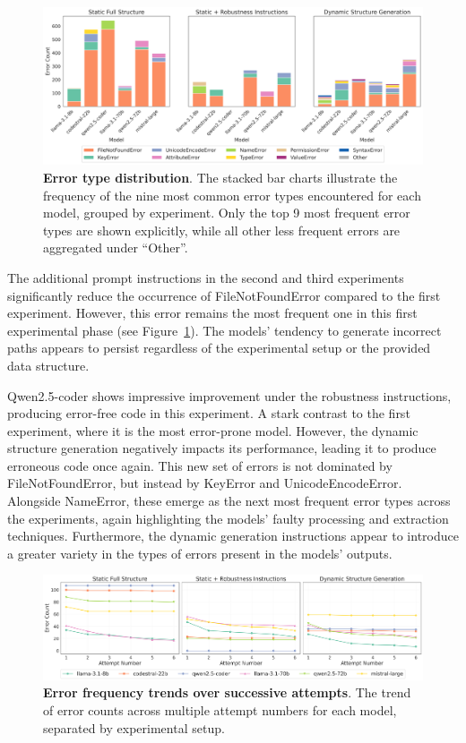 \documentclass{DESSThesis}
\begin{document}
\begin{figure}[ht]
    \centering
    \includegraphics[width=\linewidth]{img/Results/First Experimental Phase/Error Type Distribution per Model.png}
    \caption[Error type distribution]{\textbf{Error type distribution}. The stacked bar charts illustrate the frequency of the nine most common error types encountered for each model, grouped by experiment. Only the top 9 most frequent error types are shown explicitly, while all other less frequent errors are aggregated under “Other”.}
    \label{fig:error_distribution}
\end{figure}

The additional prompt instructions in the second and third experiments significantly reduce the occurrence of FileNotFoundError compared to the first experiment. However, this error remains the most frequent one in this first experimental phase (see Figure~\ref{fig:error_distribution}). The models' tendency to generate incorrect paths appears to persist regardless of the experimental setup or the provided data structure.

Qwen2.5-coder shows impressive improvement under the robustness instructions, producing error-free code in this experiment. A stark contrast to the first experiment, where it is the most error-prone model. However, the dynamic structure generation negatively impacts its performance, leading it to produce erroneous code once again. This new set of errors is not dominated by FileNotFoundError, but instead by KeyError and UnicodeEncodeError. Alongside NameError, these emerge as the next most frequent error types across the experiments, again highlighting the models' faulty processing and extraction techniques. Furthermore, the dynamic generation instructions appear to introduce a greater variety in the types of errors present in the models' outputs.

\begin{figure}[ht]
    \centering
    \includegraphics[width=\linewidth]{img/Results/First Experimental Phase/Error Trend Over Attempts.png}
    \caption[Error frequency trends over successive attempts]{\textbf{Error frequency trends over successive attempts}. The trend of error counts across multiple attempt numbers for each model, separated by experimental setup.}
    \label{fig:error_trends}
\end{figure}
\end{document}
